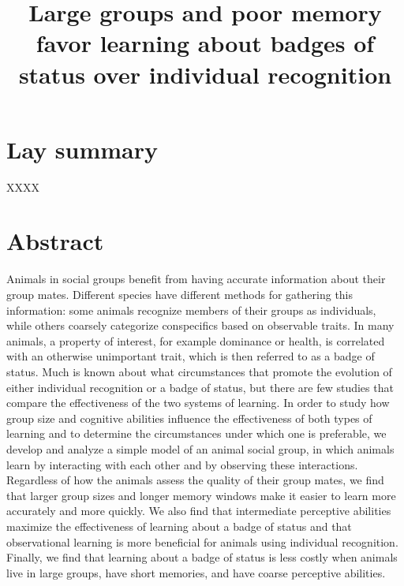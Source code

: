 




\noindent
\title{Large groups and poor memory favor learning about badges of status over individual recognition} 
\author{}
\date{} 
\maketitle


\linenumbers

\section*{Lay summary}
XXXX

\section*{Abstract}
Animals in social groups benefit from having accurate information about their group mates. Different species have different methods for gathering this information: some animals recognize members of their groups as individuals, while others coarsely categorize conspecifics based on observable traits. In many animals, a property of interest, for example dominance or health, is correlated with an otherwise unimportant trait, which is then referred to as a badge of status. Much is known about what circumstances that promote the evolution of either individual recognition or a badge of status, but there are few studies that compare the effectiveness of the two systems of learning. In order to study how group size and cognitive abilities influence the effectiveness of both types of learning and to determine the circumstances under which one is preferable, we develop and analyze a simple model of an animal social group, in which animals learn by interacting with each other and by observing these interactions. Regardless of how the animals assess the quality of their group mates, we find that larger group sizes and longer memory windows make it easier to learn more accurately and more quickly. We also find that intermediate perceptive abilities maximize the effectiveness of learning about a badge of status and that observational learning is more beneficial for animals using individual recognition. Finally, we find that learning about a badge of status is less costly when animals live in large groups, have short memories, and have coarse perceptive abilities.



